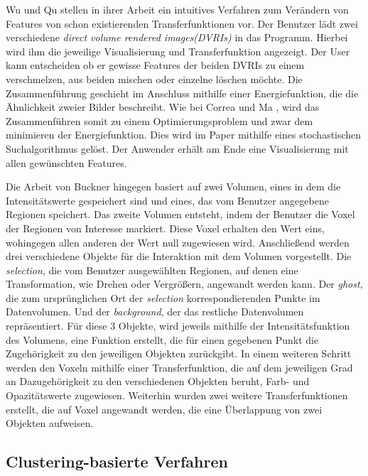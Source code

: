 Wu und Qu stellen in ihrer Arbeit \cite{wu2007interactive} ein intuitives Verfahren zum Verändern von Features von schon existierenden Transferfunktionen vor.
Der Benutzer lädt zwei verschiedene \textit{direct volume rendered images(DVRIs)} in das Programm. Hierbei wird ihm die jeweilige Visualisierung und Transferfunktion angezeigt. Der User kann entscheiden ob er gewisse Features der beiden DVRIs zu einem verschmelzen, aus beiden mischen oder einzelne löschen möchte.
Die Zusammenführung geschieht im Anschluss mithilfe einer Energiefunktion, die die Ähnlichkeit zweier Bilder beschreibt. Wie bei Correa und Ma \cite{correa2009visibility}, wird das Zusammenführen somit zu einem Optimierungsproblem und zwar dem minimieren der Energiefunktion. Dies wird im Paper mithilfe eines stochastischen Suchalgorithmus gelöst.
Der Anwender erhält am Ende eine Visualisierung mit allen gewünschten Features.


Die Arbeit von Buckner \cite{bruckner2005volumeshop} hingegen basiert auf zwei Volumen, eines in dem die Intensitätswerte gespeichert sind und eines, das vom Benutzer angegebene Regionen speichert.
Das zweite Volumen entsteht, indem der Benutzer die Voxel der Regionen von Interesse markiert. Diese Voxel erhalten den Wert eins, wohingegen allen anderen der Wert null zugewiesen wird.
Anschließend werden drei verschiedene Objekte für die Interaktion mit dem Volumen vorgestellt. Die \textit{selection}, die vom Benutzer ausgewählten Regionen, auf denen eine Transformation, wie Drehen oder Vergrößern, angewandt werden kann. Der \textit{ghost}, die zum ursprünglichen Ort der \textit{selection} korrespondierenden Punkte im Datenvolumen. Und der \textit{background}, der das restliche Datenvolumen repräsentiert.
Für diese 3 Objekte, wird jeweils mithilfe der Intensitätsfunktion des Volumens, eine Funktion erstellt, die für einen gegebenen Punkt die Zugehörigkeit zu den jeweiligen Objekten zurückgibt.
\newline
In einem weiteren Schritt werden den Voxeln mithilfe einer Transferfunktion, die auf dem jeweiligen Grad an Dazugehörigkeit zu den verschiedenen Objekten beruht, Farb- und Opazitätswerte zugewiesen.
Weiterhin wurden zwei weitere Transferfunktionen erstellt, die auf Voxel angewandt werden, die eine Überlappung von zwei Objekten aufweisen.



\subsection{Clustering-basierte Verfahren}

